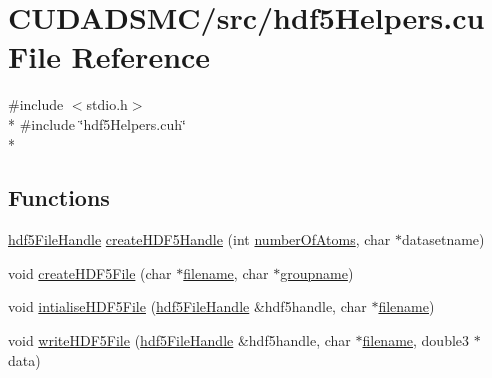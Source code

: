 \hypertarget{hdf5_helpers_8cu}{\section{C\+U\+D\+A\+D\+S\+M\+C/src/hdf5\+Helpers.cu File Reference}
\label{hdf5_helpers_8cu}
}
{\ttfamily \#include $<$stdio.\+h$>$}\\*
{\ttfamily \#include \char`\"{}hdf5\+Helpers.\+cuh\char`\"{}}\\*
\subsection*{Functions}
\begin{DoxyCompactItemize}
\item 
\hyperlink{structhdf5_file_handle}{hdf5\+File\+Handle} \hyperlink{hdf5_helpers_8cu_ac7967eb74c2b889d3ff30829b7ad5354}{create\+H\+D\+F5\+Handle} (int \hyperlink{initial_system_parameters_8cuh_a5ce690e43012981ef3034cbf0c746489}{number\+Of\+Atoms}, char $\ast$datasetname)
\item 
void \hyperlink{hdf5_helpers_8cu_aa934ce2162402ac5571b0a9273a8d540}{create\+H\+D\+F5\+File} (char $\ast$\hyperlink{main_8cu_a6c2affe0788e6ba12dce7a51e1bd35c3}{filename}, char $\ast$\hyperlink{main_8cu_a8fed0c6a45def4b6cfc33b6c2d6b529a}{groupname})
\item 
void \hyperlink{hdf5_helpers_8cu_ad645ffddc471fbc80396e341cd9c5b46}{intialise\+H\+D\+F5\+File} (\hyperlink{structhdf5_file_handle}{hdf5\+File\+Handle} \&hdf5handle, char $\ast$\hyperlink{main_8cu_a6c2affe0788e6ba12dce7a51e1bd35c3}{filename})
\item 
void \hyperlink{hdf5_helpers_8cu_a8afd9ab3ed3821c7405255e317542636}{write\+H\+D\+F5\+File} (\hyperlink{structhdf5_file_handle}{hdf5\+File\+Handle} \&hdf5handle, char $\ast$\hyperlink{main_8cu_a6c2affe0788e6ba12dce7a51e1bd35c3}{filename}, double3 $\ast$data)
\end{DoxyCompactItemize}


